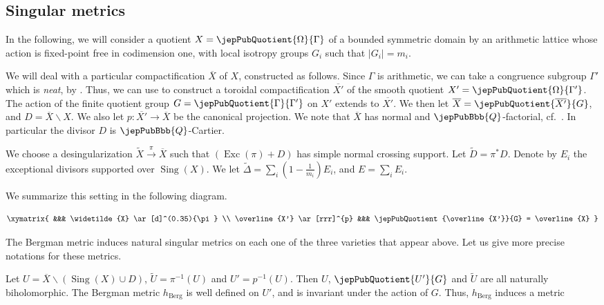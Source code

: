 \subsection{Singular metrics}
In the following, we will consider a quotient $X = \jepPubQuotient{\Omega}{\Gamma}$ of a bounded symmetric domain by an arithmetic lattice whose action is fixed-point free in codimension one, with local isotropy groups $G_i$ such that $|G_i|=m_i$.

We will deal with a particular compactification $\overline{X}$ of $X$, constructed as follows. Since $\Gamma$ is arithmetic, we can take a congruence subgroup $\Gamma'$ which is \emph{neat}, by \cite{pubref04}. Thus, we can use \cite{pubref01} to construct a toroidal compactification $\overline{X'}$ of the smooth quotient $X' = \jepPubQuotient{\Omega}{\Gamma'}$. The action of the finite quotient group $G = \jepPubQuotient{\Gamma}{\Gamma'}$ on $X'$ extends to $\overline{X'}$. We then let $\overline{X} = \jepPubQuotient{ \overline{X'}}{G}$, and  $D = \overline{X} \smallsetminus X$. We also let $p : \overline{X'} \longrightarrow \overline{X}$ be the canonical projection. We note that $\overline{X}$ has normal and $\jepPubBbb{Q}$-factorial, cf.~\cite[Lem.\,5.16]{pubref19}.
In particular the divisor $D$ is $\jepPubBbb{Q}$-Cartier. 

We choose a desingularization $\widetilde{X} \overset{\pi}{\longrightarrow} \overline{X}$ such that $(\operatorname{Exc}(\pi) + D)$ has simple normal crossing
support. Let $\widetilde{D} = \pi^\ast D$. Denote by $E_i$ the exceptional divisors supported over $\operatorname{Sing}(X)$. We let $\widetilde{\Delta} = \sum_i \left(1 - \frac{1}{m_i} \right) E_i$, and $E = \sum_i E_i$.

We summarize this setting in the following diagram.

  $$
  \xymatrix{
     &&& \widetilde{X} \ar[d]^(0.35){\pi} \\
      \overline{X'} \ar[rrr]^{p}     &&& \jepPubQuotient{\overline{X'}}{G} = \overline{X}
   } $$

The Bergman metric induces natural singular metrics on each one of the three varieties that appear above. Let us give more precise notations for these metrics.

Let $U = \overline{X} \smallsetminus \left( \operatorname{Sing}(X) \cup D \right)$, $\widetilde{U} = \pi^{-1}(U)$ and $U' = p^{-1}(U)$. Then $U$, $\jepPubQuotient{U'}{G}$ and $\widetilde{U}$ are all naturally biholomorphic. The Bergman metric $h_{\mathrm{Berg}}$ is well defined on $U'$, and is invariant under the action of $G$. Thus, $h_{\mathrm{Berg}}$ induces a metric 

